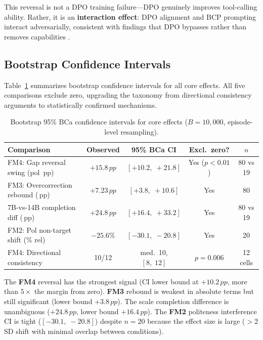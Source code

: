 \documentclass[11pt,a4paper]{article}
\newcommand{\fm}[1]{\textbf{FM#1}}
\newcommand{\pp}{\,pp}
\newcommand{\ci}[2]{[#1,\;#2]}
\begin{document}
This reversal is not a DPO training failure---DPO genuinely improves tool-calling ability.
Rather, it is an \textbf{interaction effect}: DPO alignment and BCP prompting interact adversarially, consistent with findings that DPO bypasses rather than removes capabilities \citep{lee2024dpo_toxicity}.

\subsection{Bootstrap Confidence Intervals}
\label{sec:bootstrap}

Table~\ref{tab:bootstrap_ci} summarizes bootstrap confidence intervals for all core effects.
All five comparisons exclude zero, upgrading the taxonomy from directional consistency arguments to statistically confirmed mechanisms.

\begin{table}[t]
\centering
\caption{Bootstrap 95\% BCa confidence intervals for core effects ($B{=}10{,}000$, episode-level resampling).}
\label{tab:bootstrap_ci}
\small
\begin{tabular}{lcccc}
\toprule
\textbf{Comparison} & \textbf{Observed} & \textbf{95\% BCa CI} & \textbf{Excl.\ zero?} & \textbf{$n$} \\
\midrule
FM4: Gap reversal swing (pol \pp) & $+15.8\pp$ & $\ci{+10.2}{+21.8}$ & Yes ($p<0.01$) & 80 vs 19 \\
FM3: Overcorrection rebound (\pp) & $+7.23\pp$ & $\ci{+3.8}{+10.6}$ & Yes & 80 \\
7B-vs-14B completion diff (\pp) & $+24.8\pp$ & $\ci{+16.4}{+33.2}$ & Yes & 80 vs 19 \\
FM2: Pol non-target shift (\% rel) & $-25.6\%$ & $\ci{-30.1}{-20.8}$ & Yes & 20 \\
FM4: Directional consistency & 10/12 & med.\ 10, $\ci{8}{12}$ & $p{=}0.006$ & 12 cells \\
\bottomrule
\end{tabular}
\end{table}

The \fm{4} reversal has the strongest signal (CI lower bound at $+10.2\pp$, more than $5\times$ the margin from zero).
\fm{3} rebound is weakest in absolute terms but still significant (lower bound $+3.8\pp$).
The scale completion difference is unambiguous ($+24.8\pp$, lower bound $+16.4\pp$).
The \fm{2} politeness interference CI is tight ($\ci{-30.1}{-20.8}$) despite $n{=}20$ because the effect size is large ($>$2 SD shift with minimal overlap between conditions).
\end{document}
